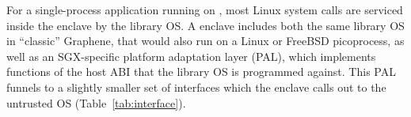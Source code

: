 


For a single-process application running on \graphenesgx{},
most Linux system calls are serviced inside the enclave by the library OS.
A \graphenesgx{} enclave includes both the same library OS 
in ``classic'' Graphene, that would also run on a Linux or FreeBSD picoprocess,
as well as an SGX-specific platform adaptation layer (PAL), 
which implements \palcallnum{} functions of the host ABI that the library OS is programmed against.
This PAL funnels to a slightly smaller set of
\enclavecallnum{} interfaces which the enclave calls out to the untrusted OS (Table~\ref{tab:interface}).









